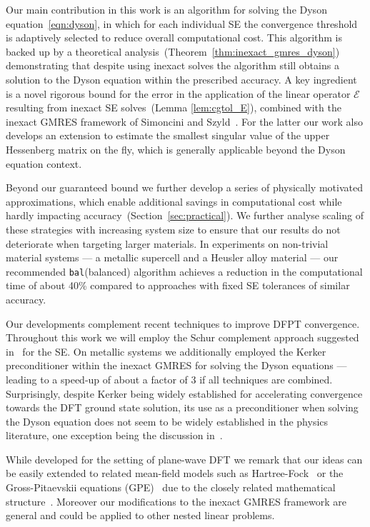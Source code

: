 \documentclass[hidelinks,onefignum,onetabnum]{siamart250211}
\newcommand{\sbal}{\texttt{bal}\xspace}
\begin{document}
Our main contribution in this work is an algorithm for solving
the Dyson equation~\eqref{eqn:dyson},
in which for each individual SE the convergence threshold
is adaptively selected to reduce overall computational cost.
This algorithm is backed up by a theoretical analysis~(Theorem~\ref{thm:inexact_gmres_dyson})
demonstrating that despite using inexact solves the algorithm still obtains
a solution to the Dyson equation within the prescribed accuracy.
A key ingredient is a novel rigorous bound for the error in the application
of the linear operator $\mathcal{E}$ resulting from inexact SE solves~(Lemma \ref{lem:cgtol_E}),
combined with the inexact GMRES framework of Simoncini and Szyld~\cite{simoncini2003theory}.
For the latter our work also develops an extension
to estimate the smallest singular value of the upper Hessenberg matrix
on the fly, which is generally applicable beyond the Dyson equation context.

Beyond our guaranteed bound we further develop a series of physically motivated approximations,
which enable additional savings in computational cost while
hardly impacting accuracy~(Section~\ref{sec:practical}).
We further analyse scaling of these strategies with increasing system size
to ensure that our results do not deteriorate %
when targeting larger materials.
In experiments on non-trivial material systems ---
a metallic supercell and a Heusler alloy material ---
our recommended \sbal (balanced) algorithm achieves a reduction in the computational
time of about 40\% compared to approaches with fixed SE tolerances of similar accuracy.

Our developments complement recent techniques to improve DFPT convergence.
Throughout this work we will employ the Schur complement approach suggested
in~\cite{cances2023numerical} for the SE. On metallic systems we additionally
employed the Kerker preconditioner within the inexact GMRES
for solving the Dyson equations --- leading to a speed-up of about a factor of $3$
if all techniques are combined.
Surprisingly, despite Kerker being widely established for accelerating
convergence towards the DFT ground state solution,
its use as a preconditioner
when solving the Dyson equation does not seem
to be widely established in the physics literature,
one exception being the discussion in~\cite{Gerhorst2024}.

While developed for the setting of plane-wave DFT we remark that our ideas can
be easily extended to related mean-field models such as
Hartree-Fock~\cite{lin2019math_electronic}
or the Gross-Pitaevskii equations (GPE)~\cite{bao2013mathematical}
due to the closely related mathematical structure~\cite{cances2010naofnep}.
Moreover our modifications to the inexact GMRES framework are general and 
could be applied to other nested linear problems.
\end{document}
